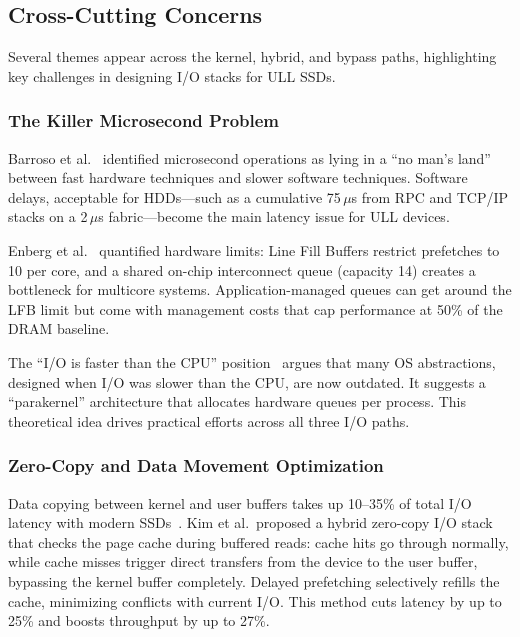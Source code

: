 \documentclass[conference]{IEEEtran}
\begin{document}
\subsection{Cross-Cutting Concerns}
\label{sec:crosscut}

Several themes appear across the kernel, hybrid, and bypass paths, highlighting key challenges in designing I/O stacks for ULL SSDs.

\subsubsection{The Killer Microsecond Problem}
\label{sec:killer}

Barroso et al.~\cite{barroso2017killer} identified microsecond operations as lying in a ``no man's land'' between fast hardware techniques and slower software techniques. Software delays, acceptable for HDDs---such as a cumulative 75\,$\mu$s from RPC and TCP/IP stacks on a 2\,$\mu$s fabric---become the main latency issue for ULL devices.

Enberg et al.~\cite{enberg2017taming} quantified hardware limits: Line Fill Buffers restrict prefetches to 10 per core, and a shared on-chip interconnect queue (capacity 14) creates a bottleneck for multicore systems. Application-managed queues can get around the LFB limit but come with management costs that cap performance at 50\% of the DRAM baseline.

The ``I/O is faster than the CPU'' position~\cite{io2021faster} argues that many OS abstractions, designed when I/O was slower than the CPU, are now outdated. It suggests a ``parakernel'' architecture that allocates hardware queues per process. This theoretical idea drives practical efforts across all three I/O paths.

\subsubsection{Zero-Copy and Data Movement Optimization}
\label{sec:zerocopy}

Data copying between kernel and user buffers takes up 10--35\% of total I/O latency with modern SSDs~\cite{kim2022zerocopy}. Kim et al.\ proposed a hybrid zero-copy I/O stack that checks the page cache during buffered reads: cache hits go through normally, while cache misses trigger direct transfers from the device to the user buffer, bypassing the kernel buffer completely. Delayed prefetching selectively refills the cache, minimizing conflicts with current I/O. This method cuts latency by up to 25\% and boosts throughput by up to 27\%.
\end{document}
